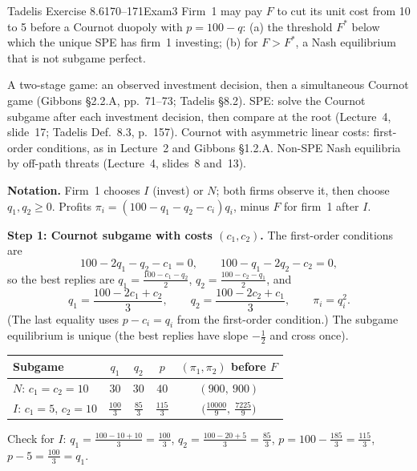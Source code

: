 \begin{exsol}{Tadelis Exercise 8.6}{170--171}{Exam}{3}
\asked Firm~1 may pay $F$ to cut its unit cost from 10 to 5 before a Cournot duopoly with
$p = 100 - q$: (a) the threshold $F^*$ below which the unique SPE has firm~1 investing; (b) for
$F > F^*$, a Nash equilibrium that is not subgame perfect.

\method A two-stage game: an observed investment decision, then a simultaneous Cournot game
(Gibbons \S2.2.A, pp.~71--73; Tadelis \S8.2). SPE: solve the Cournot subgame after each investment
decision, then compare at the root (Lecture~4, slide~17; Tadelis Def.~8.3, p.~157). Cournot with
asymmetric linear costs: first-order conditions, as in Lecture~2 and Gibbons \S1.2.A. Non-SPE Nash
equilibria by off-path threats (Lecture~4, slides~8 and~13).

\solution
\textbf{Notation.} Firm~1 chooses $I$ (invest) or $N$; both firms observe it, then choose $q_1, q_2
\ge 0$. Profits $\pi_i = (100 - q_1 - q_2 - c_i)q_i$, minus $F$ for firm~1 after $I$.

\textbf{Step 1: Cournot subgame with costs $(c_1, c_2)$.} The first-order conditions are
\[
  100 - 2q_1 - q_2 - c_1 = 0, \qquad 100 - q_1 - 2q_2 - c_2 = 0 ,
\]
so the best replies are $q_1 = \frac{100 - c_1 - q_2}{2}$, $q_2 = \frac{100 - c_2 - q_1}{2}$, and
\begin{equation}
  q_1 = \frac{100 - 2c_1 + c_2}{3}, \qquad q_2 = \frac{100 - 2c_2 + c_1}{3}, \qquad \pi_i = q_i^2 .
  \label{eq:tadelis-8-6-cournot}
\end{equation}
(The last equality uses $p - c_i = q_i$ from the first-order condition.) The subgame equilibrium is
unique (the best replies have slope $-\frac12$ and cross once).
\begin{center}
\begin{tabular}{lcccc}
\toprule
Subgame & $q_1$ & $q_2$ & $p$ & $(\pi_1, \pi_2)$ before $F$ \\
\midrule
$N$: $c_1 = c_2 = 10$ & $30$ & $30$ & $40$ & $(900,\ 900)$ \\
$I$: $c_1 = 5$, $c_2 = 10$ & $\frac{100}{3}$ & $\frac{85}{3}$ & $\frac{115}{3}$ & $\bigl(\frac{10000}{9},\ \frac{7225}{9}\bigr)$ \\
\bottomrule
\end{tabular}
\end{center}
Check for $I$: $q_1 = \frac{100 - 10 + 10}{3} = \frac{100}{3}$, $q_2 = \frac{100 - 20 + 5}{3} = \frac{85}{3}$,
$p = 100 - \frac{185}{3} = \frac{115}{3}$, $p - 5 = \frac{100}{3} = q_1$.


\end{exsol}
